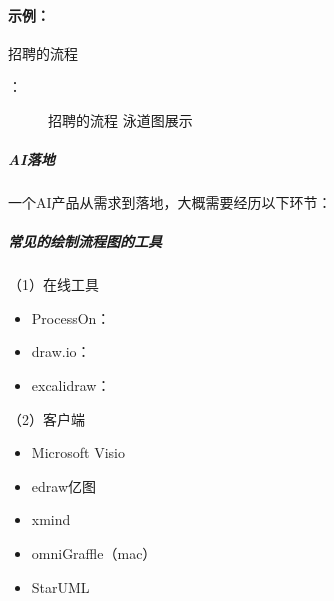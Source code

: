 \documentclass[letterpaper,10pt,english]{sphinxmanual}
\begin{document}
\paragraph{示例：}
\label{\detokenize{chapter_knowledge/flow_chart:id24}}
招聘的流程%
\begin{footnote}[591]\sphinxAtStartFootnote
{}
%
\end{footnote}：

\begin{figure}[H]
\centering
\capstart

\noindent{}
\caption{招聘的流程
泳道图展示\sphinxfootnotemark[592]}\label{\detokenize{chapter_knowledge/flow_chart:id46}}\end{figure}
%
\begin{footnotetext}[592]\sphinxAtStartFootnote
{}
%
\end{footnotetext}\ignorespaces 

\subparagraph{AI落地}
\label{\detokenize{chapter_knowledge/flow_chart:ai}}
一个AI产品从需求到落地，大概需要经历以下环节：



\subparagraph{常见的绘制流程图的工具}
\label{\detokenize{chapter_knowledge/flow_chart:id25}}
（1）在线工具
\begin{itemize}
\item {} 
ProcessOn：

\item {} 
draw.io：

\item {} 
excalidraw： 

\end{itemize}

（2）客户端
\begin{itemize}
\item {} 
Microsoft Visio

\item {} 
edraw亿图

\item {} 
xmind

\item {} 
omniGraffle（mac）

\item {} 
StarUML

\end{itemize}
\end{document}
